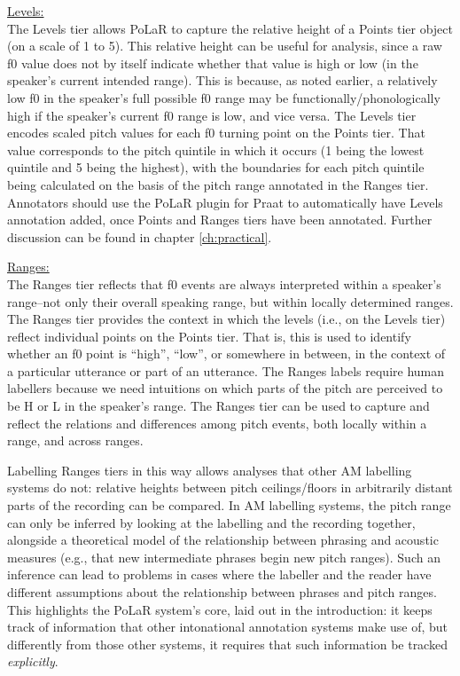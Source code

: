 \documentclass[11pt, twoside]{memoir}
\begin{document}
\uline{Levels:}\\ The Levels tier allows PoLaR to capture the relative height of a Points tier object (on a scale of 1 to 5). This relative height can be useful for analysis, since a raw f0 value does not by itself indicate whether that value is high or low (in the speaker’s current intended range). This is because, as noted earlier, a relatively low f0 in the speaker’s full possible f0 range may be functionally\slash phonologically high if the speaker’s current f0 range is low, and vice versa. The Levels tier encodes scaled pitch values for each f0 turning point on the Points tier. That value corresponds to the pitch quintile in which it occurs (1 being the lowest quintile and 5 being the highest), with the boundaries for each pitch quintile being calculated on the basis of the pitch range annotated in the Ranges tier. Annotators should use the PoLaR plugin for Praat to automatically have Levels annotation added, once Points and Ranges tiers have been annotated. Further discussion can be found in chapter \ref{ch:practical}.

\uline{Ranges:}\\ The Ranges tier reflects that f0 events are always interpreted within a speaker’s range--not only their overall speaking range, but within locally determined ranges. The Ranges tier provides the context in which the levels (i.e., on the Levels tier) reflect individual points on the Points tier. That is, this is used to identify whether an f0 point is “high”, “low”, or somewhere in between, in the context of a particular utterance or part of an utterance. The Ranges labels require human labellers because we need intuitions on which parts of the pitch are perceived to be H or L in the speaker’s range. The Ranges tier can be used to capture and reflect the relations and differences among pitch events, both locally within a range, and across ranges.

Labelling Ranges tiers in this way allows analyses that other AM labelling systems do not: relative heights between pitch ceilings\slash floors in arbitrarily distant parts of the recording can be compared. In AM labelling systems, the pitch range can only be inferred by looking at the labelling and the recording together, alongside a theoretical model of the relationship between phrasing and acoustic measures (e.g., that new intermediate phrases begin new pitch ranges). Such an inference can lead to problems in cases where the labeller and the reader have different assumptions about the relationship between phrases and pitch ranges. This highlights the PoLaR system’s core, laid out in the introduction: it keeps track of information that other intonational annotation systems make use of, but differently from those other systems, it requires that such information be tracked \emph{explicitly}.
\end{document}
